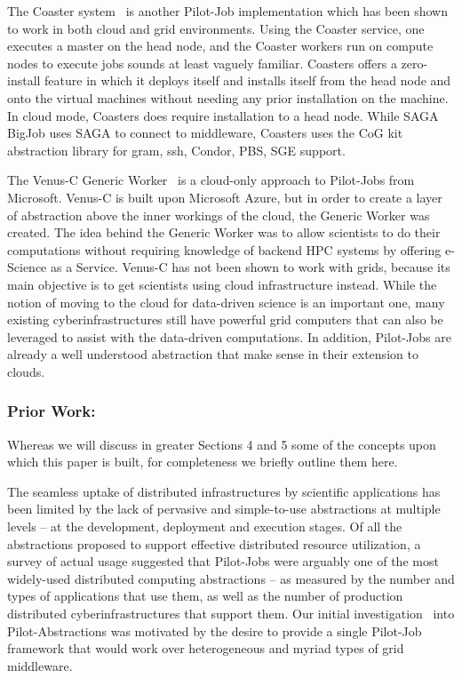 \documentclass[times]{cpeauth}
\newcommand{\alnote}[1]{ {\textcolor{green} { ***andreL: #1 }}}
\newcommand{\alnote}[1]{}
\newcommand{\pilot}{Pilot\xspace}
\newcommand{\pilotjob}{Pilot-Job\xspace}
\newcommand{\pilotjobs}{Pilot-Jobs\xspace}
\begin{document}
The Coaster system~\cite{coasters} is another \pilotjob implementation which
has been shown to work in both cloud and grid environments. Using the Coaster
service, one executes a master on the head node, and the Coaster workers run
on compute nodes to execute jobs sounds at least vaguely familiar. Coasters
offers a zero-install feature in which it deploys itself and installs itself
from the head node and onto the virtual machines without needing any prior
installation on the machine. In cloud mode, Coasters does require installation
to a head node. While SAGA BigJob uses SAGA to connect to middleware, Coasters
uses the CoG kit abstraction library for gram, ssh, Condor, PBS, SGE support.
 
The Venus-C Generic Worker~\cite{venusc-generic-worker} is a cloud-only
approach to \pilotjobs from Microsoft. Venus-C is built upon Microsoft Azure,
but in order to create a layer of abstraction above the inner workings of the
cloud, the Generic Worker was created. The idea behind the Generic
Worker was to allow scientists to do their computations without requiring knowledge of backend HPC systems by offering e-Science as a Service. Venus-C has not
been shown to work with grids, because its main objective is to get scientists
using cloud infrastructure instead. While the notion of moving to the cloud
for data-driven science is an important one, many existing
cyberinfrastructures still have powerful grid computers that can also be
leveraged to assist with the data-driven computations. In addition, \pilotjobs are already a well understood abstraction that make sense in their extension to clouds.

\subsubsection*{Prior Work:}

Whereas we will discuss in greater Sections 4 and 5 some of the
concepts upon which this paper is built, for completeness we briefly
outline them here.

 The seamless uptake of distributed
infrastructures by scientific applications has been limited by the
lack of pervasive and simple-to-use abstractions at multiple levels –
at the development, deployment and execution stages. Of all the
abstractions proposed to support effective distributed resource
utilization, a survey of actual usage suggested that \pilotjobs were
arguably one of the most widely-used distributed computing
abstractions – as measured by the number and types of applications
that use them, as well as the number of production distributed
cyberinfrastructures that support them.  Our initial
investigation~\cite{Luckow:2008la} into \pilot-Abstractions
was motivated by the desire to provide a single \pilotjob framework
that would work over heterogeneous and myriad types of grid middleware.
\end{document}
